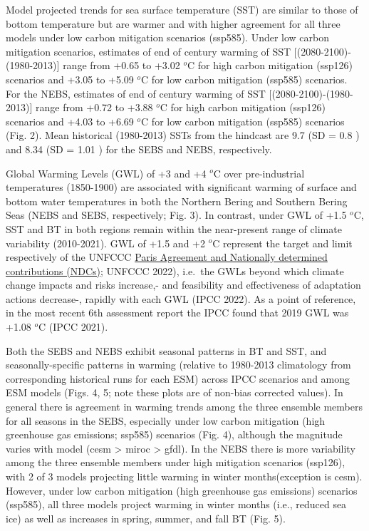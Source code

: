 \documentclass[
]{article}
\begin{document}
Model projected trends for sea surface temperature (SST) are similar to
those of bottom temperature but are warmer and with higher agreement for
all three models under low carbon mitigation scenarios (ssp585). Under
low carbon mitigation scenarios, estimates of end of century warming of
SST {[}(2080-2100)-(1980-2013){]} range from +0.65 to +3.02 \(^o\)C for
high carbon mitigation (ssp126) scenarios and +3.05 to +5.09 \(^o\)C for
low carbon mitigation (ssp585) scenarios. For the NEBS, estimates of end
of century warming of SST {[}(2080-2100)-(1980-2013){]} range from +0.72
to +3.88 \(^o\)C for high carbon mitigation (ssp126) scenarios and +4.03
to +6.69 \(^o\)C for low carbon mitigation (ssp585) scenarios (Fig. 2).
Mean historical (1980-2013) SSTs from the hindcast are 9.7 (SD = 0.8 )
and 8.34 (SD = 1.01 ) for the SEBS and NEBS, respectively.

Global Warming Levels (GWL) of +3 and +4 \(^o\)C over pre-industrial
temperatures (1850-1900) are associated with significant warming of
surface and bottom water temperatures in both the Northern Bering and
Southern Bering Seas (NEBS and SEBS, respectively; Fig. 3). In contrast,
under GWL of +1.5 \(^o\)C, SST and BT in both regions remain within the
near-present range of climate variability (2010-2021). GWL of +1.5 and
+2 \(^o\)C represent the target and limit respectively of the UNFCCC
\href{https://unfccc.int/ndc-synthesis-report-2022\#Projected-GHG-Emission-levels}{Paris
Agreement and Nationally determined contributions (NDCs)}; UNFCCC 2022),
i.e.~the GWLs beyond which climate change impacts and risks increase,-
and feasibility and effectiveness of adaptation actions decrease-,
rapidly with each GWL (IPCC 2022). As a point of reference, in the most
recent 6th assessment report the IPCC found that 2019 GWL was +1.08
\(^o\)C (IPCC 2021).

Both the SEBS and NEBS exhibit seasonal patterns in BT and SST, and
seasonally-specific patterns in warming (relative to 1980-2013
climatology from corresponding historical runs for each ESM) across IPCC
scenarios and among ESM models (Figs. 4, 5; note these plots are of
non-bias corrected values). In general there is agreement in warming
trends among the three ensemble members for all seasons in the SEBS,
especially under low carbon mitigation (high greenhouse gas emissions;
ssp585) scenarios (Fig. 4), although the magnitude varies with model
(cesm \textgreater{} miroc \textgreater{} gfdl). In the NEBS there is
more variability among the three ensemble members under high mitigation
scenarios (ssp126), with 2 of 3 models projecting little warming in
winter months(exception is cesm). However, under low carbon mitigation
(high greenhouse gas emissions) scenarios (ssp585), all three models
project warming in winter months (i.e., reduced sea ice) as well as
increases in spring, summer, and fall BT (Fig. 5).
\end{document}
